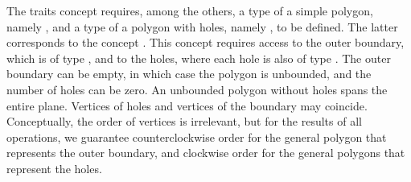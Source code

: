 The traits concept  requires, among the 
others, a type of a simple polygon, namely , and a type of 
a polygon with holes, namely , to be defined.
The latter corresponds to the concept . 
This concept requires access to the outer boundary, which is of type 
, and to the holes, where each hole is also of type 
. The outer boundary can be empty, in which case the 
polygon is unbounded, and the number of holes can be zero. An unbounded
polygon without holes spans the entire plane. Vertices of holes and 
vertices of the boundary may coincide. Conceptually, the order of vertices 
is irrelevant, but for the results of all operations, we guarantee 
counterclockwise order for the general polygon that represents the outer 
boundary, and clockwise order for the general polygons that represent the 
holes.

